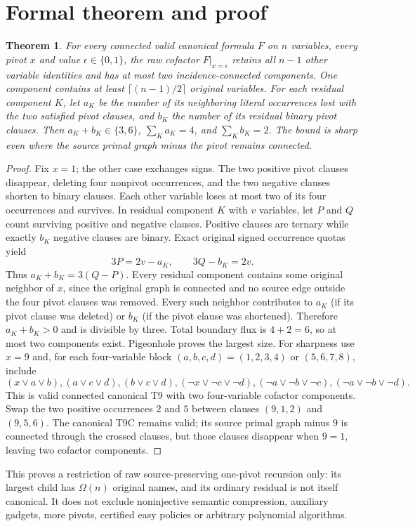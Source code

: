 \documentclass[10pt]{article}
\newtheorem{theorem}{Theorem}
\begin{document}
\section{Formal theorem and proof}
\begin{theorem}
For every connected valid canonical formula $F$ on $n$ variables, every pivot $x$ and value $\epsilon\in\{0,1\}$, the raw cofactor $F|_{x=\epsilon}$ retains all $n-1$ other variable identities and has at most \emph{two} incidence-connected components. One component contains at least $\lceil(n-1)/2\rceil$ original variables. For each residual component $K$, let $a_K$ be the number of its neighboring literal occurrences lost with the two satisfied pivot clauses, and $b_K$ the number of its residual binary pivot clauses. Then $a_K+b_K\in\{3,6\}$, $\sum_K a_K=4$, and $\sum_K b_K=2$. The bound is sharp even where the source primal graph minus the pivot remains connected.
\end{theorem}
\begin{proof}
Fix $x=1$; the other case exchanges signs. The two positive pivot clauses disappear, deleting four nonpivot occurrences, and the two negative clauses shorten to binary clauses. Each other variable loses at most two of its four occurrences and survives. In residual component $K$ with $v$ variables, let $P$ and $Q$ count surviving positive and negative clauses. Positive clauses are ternary while exactly $b_K$ negative clauses are binary. Exact original signed occurrence quotas yield
\[
3P=2v-a_K,\qquad 3Q-b_K=2v.
\]
Thus $a_K+b_K=3(Q-P)$. Every residual component contains some original neighbor of $x$, since the original graph is connected and no source edge outside the four pivot clauses was removed. Every such neighbor contributes to $a_K$ (if its pivot clause was deleted) or $b_K$ (if the pivot clause was shortened). Therefore $a_K+b_K>0$ and is divisible by three. Total boundary flux is $4+2=6$, so at most two components exist. Pigeonhole proves the largest size.
For sharpness use $x=9$ and, for each four-variable block $(a,b,c,d)=(1,2,3,4)$ or $(5,6,7,8)$, include
\[
(x\vee a\vee b),(a\vee c\vee d),(b\vee c\vee d),
(\neg x\vee\neg c\vee\neg d),(\neg a\vee\neg b\vee\neg c),
(\neg a\vee\neg b\vee\neg d).
\]
This is valid connected canonical T9 with two four-variable cofactor components. Swap the two positive occurrences $2$ and $5$ between clauses $(9,1,2)$ and $(9,5,6)$. The canonical T9C remains valid; its source primal graph minus $9$ is connected through the crossed clauses, but those clauses disappear when $9=1$, leaving two cofactor components.
\end{proof}
This proves a restriction of raw source-preserving one-pivot recursion only: its largest child has $\Omega(n)$ original names, and its ordinary residual is not itself canonical. It does not exclude noninjective semantic compression, auxiliary gadgets, more pivots, certified easy policies or arbitrary polynomial algorithms.
\end{document}
